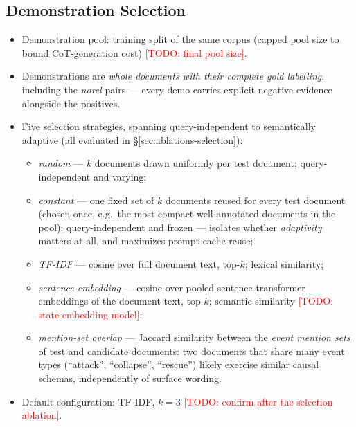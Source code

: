 \documentclass[11pt]{article}
\newcommand{\todo}[1]{\textcolor{red}{[TODO: #1]}}
\begin{document}
\subsection{Demonstration Selection}
\label{sec:selection}
\begin{itemize}
  \item Demonstration pool: training split of the same corpus (capped pool
        size to bound CoT-generation cost) \todo{final pool size}.
  \item Demonstrations are \emph{whole documents with their complete gold
        labelling}, including the \textit{norel} pairs --- every demo carries
        explicit negative evidence alongside the positives.
  \item Five selection strategies, spanning query-independent to
        semantically adaptive (all evaluated in
        \S\ref{sec:ablations-selection}):
        \begin{itemize}
          \item \emph{random} --- $k$ documents drawn uniformly per test
                document; query-independent and varying;
          \item \emph{constant} --- one fixed set of $k$ documents reused for
                every test document (chosen once, e.g.\ the most compact
                well-annotated documents in the pool); query-independent and
                frozen --- isolates whether \emph{adaptivity} matters at all,
                and maximizes prompt-cache reuse;
          \item \emph{TF-IDF} --- cosine over full document text, top-$k$;
                lexical similarity;
          \item \emph{sentence-embedding} --- cosine over pooled
                sentence-transformer embeddings of the document text, top-$k$;
                semantic similarity \todo{state embedding model};
          \item \emph{mention-set overlap} --- Jaccard similarity between the
                \emph{event mention sets} of test and candidate documents:
                two documents that share many event types (``attack'',
                ``collapse'', ``rescue'') likely exercise similar causal
                schemas, independently of surface wording.
        \end{itemize}
  \item Default configuration: TF-IDF, $k=3$ \todo{confirm after the
        selection ablation}.
\end{itemize}
\end{document}
